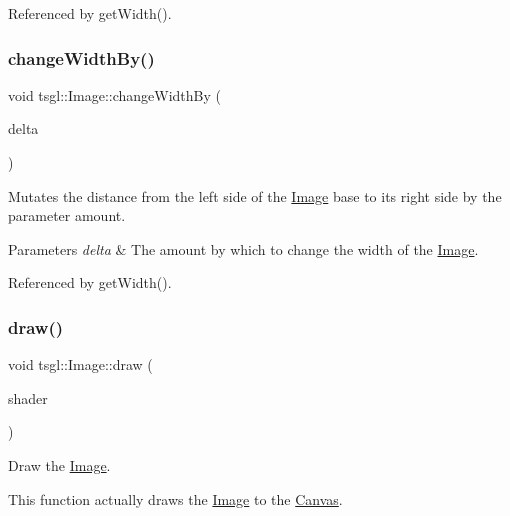 Referenced by get\+Width().

\mbox{\label{classtsgl_1_1_image_a3a02c78e7452c2b24ce71008cc6a2ee7}} 
\subsubsection{\texorpdfstring{change\+Width\+By()}{changeWidthBy()}}
{\footnotesize\ttfamily void tsgl\+::\+Image\+::change\+Width\+By (\begin{DoxyParamCaption}\item[{G\+Lfloat}]{delta }\end{DoxyParamCaption})}



Mutates the distance from the left side of the \hyperlink{classtsgl_1_1_image}{Image} base to its right side by the parameter amount. 


\begin{DoxyParams}{Parameters}
{\em delta} & The amount by which to change the width of the \hyperlink{classtsgl_1_1_image}{Image}. \\
\hline
\end{DoxyParams}


Referenced by get\+Width().

\mbox{\label{classtsgl_1_1_image_a42c7d354c766d06779d46e2ad0667027}} 
\subsubsection{\texorpdfstring{draw()}{draw()}}
{\footnotesize\ttfamily void tsgl\+::\+Image\+::draw (\begin{DoxyParamCaption}\item[{Shader $\ast$}]{shader }\end{DoxyParamCaption})\hspace{0.3cm}{\ttfamily [virtual]}}



Draw the \hyperlink{classtsgl_1_1_image}{Image}. 

This function actually draws the \hyperlink{classtsgl_1_1_image}{Image} to the \hyperlink{classtsgl_1_1_canvas}{Canvas}. 

